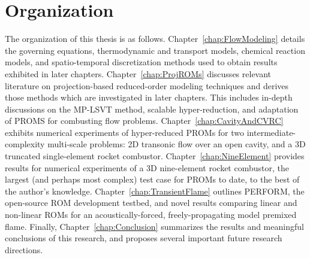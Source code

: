 \section{Organization}

The organization of this thesis is as follows. Chapter~\ref{chap:FlowModeling} details the governing equations, thermodynamic and transport models, chemical reaction models, and spatio-temporal discretization methods used to obtain results exhibited in later chapters. Chapter~\ref{chap:ProjROMs} discusses relevant literature on projection-based reduced-order modeling techniques and derives those methods which are investigated in later chapters. This includes in-depth discussions on the MP-LSVT method, scalable hyper-reduction, and adaptation of PROMS for combusting flow problems. Chapter~\ref{chap:CavityAndCVRC} exhibits numerical experiments of hyper-reduced PROMs for two intermediate-complexity multi-scale problems: 2D transonic flow over an open cavity, and a 3D truncated single-element rocket combustor. Chapter~\ref{chap:NineElement} provides results for numerical experiments of a 3D nine-element rocket combustor, the largest (and perhaps most complex) test case for PROMs to date, to the best of the author's knowledge. {\color{red}Chapter~\ref{chap:TransientFlame} outlines PERFORM, the open-source ROM development testbed, and novel results comparing linear and non-linear ROMs for an acoustically-forced, freely-propagating model premixed flame.} Finally, Chapter~\ref{chap:Conclusion} summarizes the results and meaningful conclusions of this research, and proposes several important future research directions.